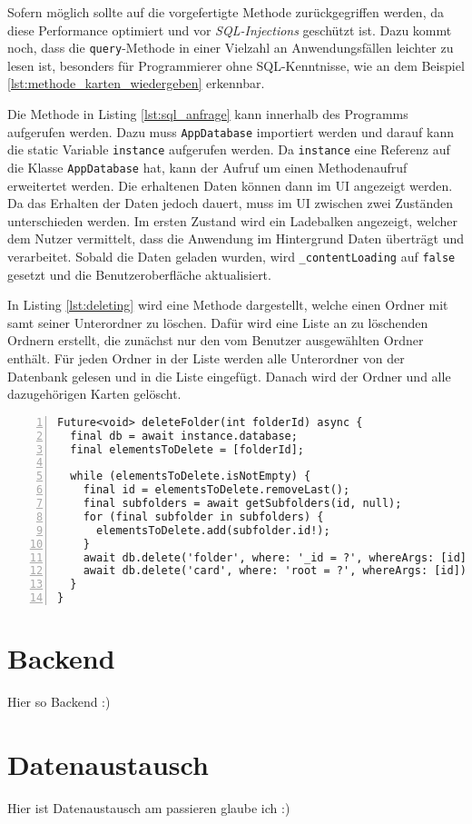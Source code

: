 Sofern möglich sollte auf die vorgefertigte Methode zurückgegriffen werden, da diese Performance optimiert und vor \textit{SQL-Injections} geschützt ist. Dazu kommt noch, dass die \texttt{query}-Methode in einer Vielzahl an Anwendungsfällen leichter zu lesen ist, besonders für Programmierer ohne SQL-Kenntnisse, wie an dem Beispiel \ref{lst:methode_karten_wiedergeben} erkennbar.

Die Methode in Listing \ref{lst:sql_anfrage} kann innerhalb des Programms aufgerufen werden. Dazu muss \texttt{AppDatabase} importiert werden und darauf kann die static Variable \texttt{instance} aufgerufen werden. Da \texttt{instance} eine Referenz auf die Klasse \texttt{AppDatabase} hat, kann der Aufruf um einen Methodenaufruf erweitertet werden. Die erhaltenen Daten können dann im UI angezeigt werden. Da das Erhalten der Daten jedoch dauert, muss im UI zwischen zwei Zuständen unterschieden werden. Im ersten Zustand wird ein Ladebalken angezeigt, welcher dem Nutzer vermittelt, dass die Anwendung im Hintergrund Daten überträgt und verarbeitet. Sobald die Daten geladen wurden, wird \texttt{\_contentLoading} auf \texttt{false} gesetzt und die Benutzeroberfläche aktualisiert. 

In Listing \ref{lst:deleting} wird eine Methode dargestellt, welche einen Ordner mit samt seiner Unterordner zu löschen. Dafür wird eine Liste an zu löschenden Ordnern erstellt, die zunächst nur den vom Benutzer ausgewählten Ordner enthält. Für jeden Ordner in der Liste werden alle Unterordner von der Datenbank gelesen und in die Liste eingefügt. Danach wird der Ordner und alle dazugehörigen Karten gelöscht.

\begin{lstlisting}[caption={Methode zum löschen eines Ordners samt Inhalt und Unterordner},captionpos=b,label={lst:deleting},numbers=left,frame=none,escapechar=|]
Future<void> deleteFolder(int folderId) async {
  final db = await instance.database;
  final elementsToDelete = [folderId];

  while (elementsToDelete.isNotEmpty) {
    final id = elementsToDelete.removeLast();
    final subfolders = await getSubfolders(id, null);
    for (final subfolder in subfolders) {
      elementsToDelete.add(subfolder.id!);
    }
    await db.delete('folder', where: '_id = ?', whereArgs: [id]);
    await db.delete('card', where: 'root = ?', whereArgs: [id]);
  }
}
\end{lstlisting}

\section{Backend}
Hier so Backend :)

\section{Datenaustausch}
Hier ist Datenaustausch am passieren glaube ich :)
